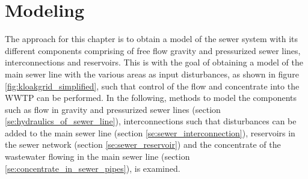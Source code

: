 \chapter{Modeling}\label{se:modeling}

The approach for this chapter is to obtain a model of the sewer system with its different components comprising of free flow gravity and pressurized sewer lines, interconnections and reservoirs. 
This is with the goal of obtaining a model of the main sewer line with the various areas as input disturbances, as shown in figure \ref{fig:kloakgrid_simplified}, such that control of the flow and concentrate into the WWTP can be performed. 
In the following, methods to model the components such as flow in gravity and pressurized sewer lines (section \ref{se:hydraulics_of_sewer_line}), interconnections such that disturbances can be added to the main sewer line (section \ref{se:sewer_interconnection}), reservoirs in the sewer network (section \ref{se:sewer_reservoir}) and the concentrate of the wastewater flowing in the main sewer line (section \ref{se:concentrate_in_sewer_pipes}), is examined.








